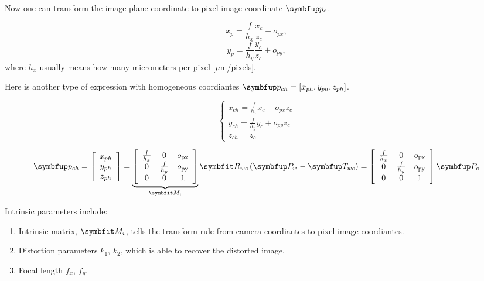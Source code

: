 Now one can transform the image plane coordinate to pixel image coordinate $\Vect{p}_c$. 

$$x_p=\frac{f}{h_x} \frac{x_c}{z_c}+o_{px},$$
$$y_p=\frac{f}{h_y} \frac{y_c}{z_c}+o_{py},$$
where $h_x$ usually means how many micrometers per pixel [$\mu$m/pixels].

Here is another type of expression with homogeneous coordiantes $\Vect{p}_{ch}=[x_{ph},y_{ph},z_{ph}]$.

\begin{equation}
\left\{\begin{array}{l}
	{x_{ch}=\frac{f}{h_{x}} x_c+o_{px} z_c} \\ 
	{y_{ch}=\frac{f}{h_{y}} y_c+o_{py} z_c} \\ 
	{z_{ch}=z_c}
	\end{array}\right.
\end{equation}

\begin{equation}
\Vect{p}_{ch}=\left[\begin{array}{c}{x_{ph}} \\ {y_{ph}} \\ {z_{ph}}\end{array}\right]=\underbrace{\left[\begin{array}{ccc}{\frac{f}{h_{x}}} & {0} & {o_{\mathrm{px}}} \\ {0} & {\frac{f}{h_{y}}} & {o_{\mathrm{py}}} \\ {0} & {0} & {1}\end{array}\right]}_{\Matr{M}_i} \Matr{R}_{wc}  \left(\Vect{P}_{w}-\Vect{T}_{wc}\right)=\left[\begin{array}{ccc}{\frac{f}{h_{x}}} & {0} & {o_{\mathrm{px}}} \\ {0} & {\frac{f}{h_{y}}} & {o_{\mathrm{py}}} \\ {0} & {0} & {1}\end{array}\right] \Vect{P}_c
\end{equation}

\begin{definition}
Intrinsic parameters include:
\begin{enumerate}
	\item Intrinsic matrix, $\Matr{M}_i$, tells the transform rule from camera coordiantes to pixel image coordiantes.
	\item Distortion parameters $k_1$, $k_2$, which is able to recover the distorted image.
	\item Focal length $f_x$, $f_y$. 
\end{enumerate}
\end{definition}
